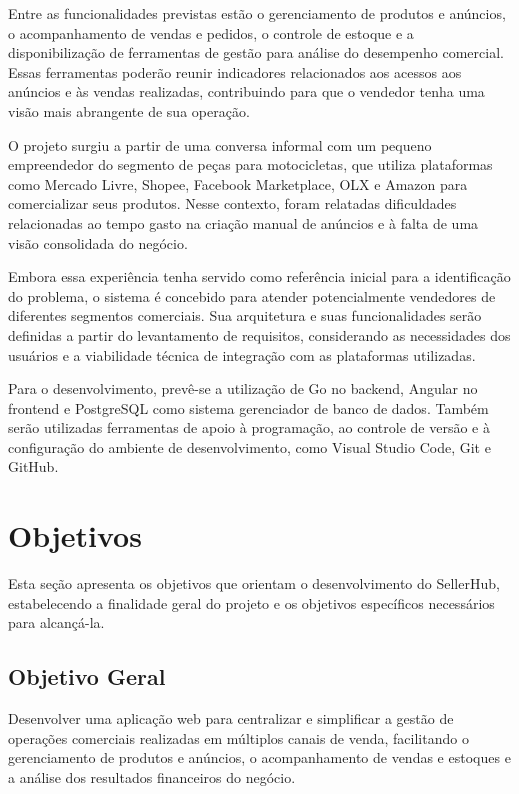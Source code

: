 Entre as funcionalidades previstas estão o gerenciamento de produtos e anúncios, o acompanhamento de vendas e pedidos, o controle de estoque e a disponibilização de ferramentas de gestão para análise do desempenho comercial. Essas ferramentas poderão reunir indicadores relacionados aos acessos aos anúncios e às vendas realizadas, contribuindo para que o vendedor tenha uma visão mais abrangente de sua operação.

O projeto surgiu a partir de uma conversa informal com um pequeno empreendedor do segmento de peças para motocicletas, que utiliza plataformas como Mercado Livre, Shopee, Facebook Marketplace, OLX e Amazon para comercializar seus produtos. Nesse contexto, foram relatadas dificuldades relacionadas ao tempo gasto na criação manual de anúncios e à falta de uma visão consolidada do negócio.

Embora essa experiência tenha servido como referência inicial para a identificação do problema, o sistema é concebido para atender potencialmente vendedores de diferentes segmentos comerciais. Sua arquitetura e suas funcionalidades serão definidas a partir do levantamento de requisitos, considerando as necessidades dos usuários e a viabilidade técnica de integração com as plataformas utilizadas.

Para o desenvolvimento, prevê-se a utilização de Go no backend, Angular no frontend e PostgreSQL como sistema gerenciador de banco de dados. Também serão utilizadas ferramentas de apoio à programação, ao controle de versão e à configuração do ambiente de desenvolvimento, como Visual Studio Code, Git e GitHub.

\section{Objetivos}

Esta seção apresenta os objetivos que orientam o desenvolvimento do SellerHub, estabelecendo a finalidade geral do projeto e os objetivos específicos necessários para alcançá-la.

\subsection{Objetivo Geral}

Desenvolver uma aplicação web para centralizar e simplificar a gestão de operações comerciais realizadas em múltiplos canais de venda, facilitando o gerenciamento de produtos e anúncios, o acompanhamento de vendas e estoques e a análise dos resultados financeiros do negócio.

